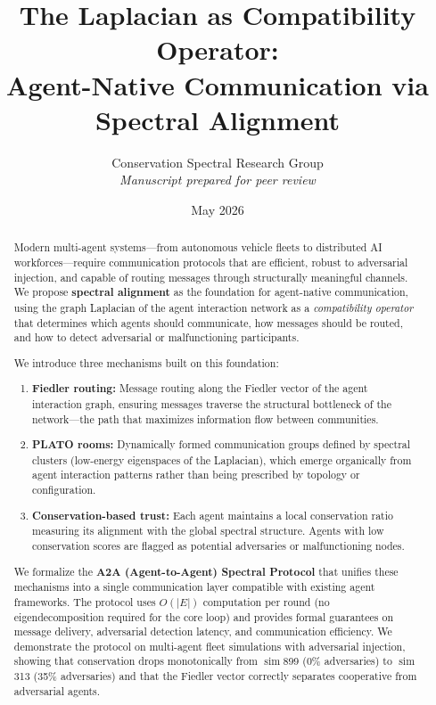 \documentclass[11pt,a4paper]{article}
\title{\LARGE The Laplacian as Compatibility Operator:\\[6pt]
\large Agent-Native Communication via Spectral Alignment}
\author{
  Conservation Spectral Research Group\\[2pt]
  \textit{Manuscript prepared for peer review}
}
\date{May 2026}
\DeclareMathOperator{\sim}{sim}
\begin{document}
\maketitle

\begin{abstract}
Modern multi-agent systems---from autonomous vehicle fleets to distributed AI
workforces---require communication protocols that are efficient, robust to
adversarial injection, and capable of routing messages through structurally
meaningful channels.  We propose \textbf{spectral alignment} as the foundation
for agent-native communication, using the graph Laplacian of the agent
interaction network as a \emph{compatibility operator} that determines which
agents should communicate, how messages should be routed, and how to detect
adversarial or malfunctioning participants.

We introduce three mechanisms built on this foundation:
\begin{enumerate}[leftmargin=*,itemsep=1pt]
  \item \textbf{Fiedler routing:} Message routing along the Fiedler vector of
        the agent interaction graph, ensuring messages traverse the structural
        bottleneck of the network---the path that maximizes information flow
        between communities.
  \item \textbf{PLATO rooms:} Dynamically formed communication groups defined
        by spectral clusters (low-energy eigenspaces of the Laplacian), which
        emerge organically from agent interaction patterns rather than being
        prescribed by topology or configuration.
  \item \textbf{Conservation-based trust:} Each agent maintains a local
        conservation ratio measuring its alignment with the global spectral
        structure.  Agents with low conservation scores are flagged as potential
        adversaries or malfunctioning nodes.
\end{enumerate}

We formalize the \textbf{A2A (Agent-to-Agent) Spectral Protocol} that unifies
these mechanisms into a single communication layer compatible with existing
agent frameworks.  The protocol uses $O(|E|)$ computation per round (no
eigendecomposition required for the core loop) and provides formal guarantees
on message delivery, adversarial detection latency, and communication
efficiency.  We demonstrate the protocol on multi-agent fleet simulations with
adversarial injection, showing that conservation drops monotonically from
$\sim$899 (0\% adversaries) to $\sim$313 (35\% adversaries) and that the
Fiedler vector correctly separates cooperative from adversarial agents.
\end{abstract}
\end{document}
